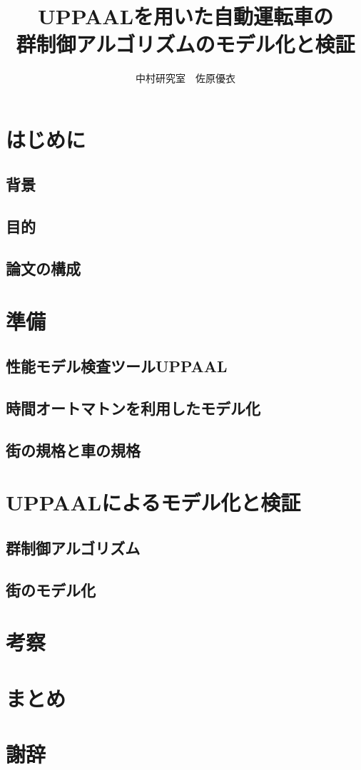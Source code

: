 \documentclass{jarticle}
\begin{document}
\title{UPPAALを用いた自動運転車の\\群制御アルゴリズムのモデル化と検証}
\author{中村研究室　佐原優衣}
\maketitle

\section{はじめに}
	\subsection{背景}
	\subsection{目的}
	\subsection{論文の構成}
\section{準備}
	\subsection{性能モデル検査ツールUPPAAL}
	\subsection{時間オートマトンを利用したモデル化}
	\subsection{街の規格と車の規格}
\section{UPPAALによるモデル化と検証}
	\subsection{群制御アルゴリズム}
	\subsection{街のモデル化}
\section{考察}
\section{まとめ}
\section*{謝辞}
\end{document}
